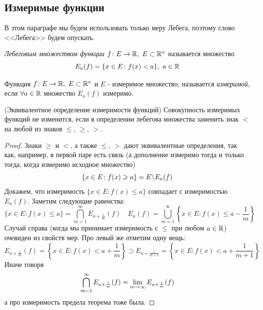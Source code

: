 \subsection{Измеримые функции}

\begin{note}
	В этом параграфе мы будем использовать только меру Лебега, поэтому слово <<Лебега>> будем опускать.
\end{note}

\begin{definition}
	\textit{Лебеговым множеством функции} $f \colon E \to \mathbb{R},\ E \subset \mathbb{R}^n$ называется множество
	\[
		E_a(f) = \{x \in E \colon f(x) < a\},\ a \in \mathbb{R}
	\]
\end{definition}

\begin{definition}
	Функция $f \colon E \to \mathbb{R},\ E \subset \mathbb{R}^n$ и $E$ - измеримое множество, называется \textit{измеримой}, если $\forall a \in \mathbb{R}$ множество $E_a(f)$ измеримо.
\end{definition}

\begin{theorem} (Эквивалентное определение измеримости функций)
	Совокупность измеримых функций не изменится, если в определении лебегова множества заменить знак $<$ на любой из знаков $\le$, $\ge$, $>$.
\end{theorem}

\begin{proof}
	Знаки $\ge$ и $<$, а также $\le$, $>$ дают эквивалентные определения, так как, например, в первой паре есть связь (а дополнение измеримо тогда и только тогда, когда измеримо исходное множество)
	\[
		\{x \in E \colon f(x) \geqslant a\} = E \backslash E_a(f)
	\]
	Докажем, что измеримость $\{x \in E \colon f(x) \le a\}$ совпадает с измеримостью $E_a(f)$. Заметим следующие равенства:
	\[
		\{x \in E \colon f(x) \le a\} = \bigcap_{m = 1}^\infty E_{a + \frac{1}{m}}(f) \quad E_a(f) = \bigcup_{m = 1}^\infty \left\{x \in E \colon f(x) \le a - \frac{1}{m}\right\}
	\]
	Случай справа (когда мы принимает измеримость с $\le$ при любом $a \in \mathbb{R}$) очевиден из свойств мер. Про левый же отметим одну вещь:
	\[
		E_{a + \frac{1}{m}}(f) = \left\{x \in E \colon f(x) < a + \frac{1}{m}\right\} \supset E_{a + \frac{1}{m + 1}} = \left\{x \in E \colon f(x) < a + \frac{1}{m + 1}\right\}
	\]
	Иначе говоря
	\[
		\bigcap_{m = 1}^\infty E_{a + \frac{1}{m}}(f) = \lim\limits_{m \to \infty} E_{a + \frac{1}{m}}(f)
	\]
	а про измеримость предела теорема тоже была.
\end{proof}

